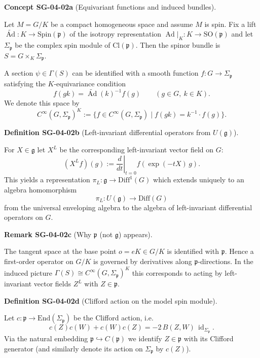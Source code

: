 \documentclass[10pt, letterpaper]{article}
\newcommand{\id}{\operatorname{id}}
\newcommand{\Ad}{\operatorname{Ad}}
\newcommand{\Cinf}{C^{\infty}}
\newcommand{\Diff}{\mathrm{Diff}}
\newcommand{\End}{\mathrm{End}}
\newcommand{\Cl}{\mathrm{Cl}}
\newcommand{\SO}{\mathrm{SO}}
\newcommand{\Spin}{\mathrm{Spin}}
\newcommand{\CustomHeading}[3]{%
  \par\medskip\noindent%
  \textbf{#1 #2} \textnormal{(#3)}.\enskip%
}
\newenvironment{DEF}[2]{\begin{unitbox}\CustomHeading{Definition}{#1}{#2}}{\end{unitbox}}
\newenvironment{REM}[2]{\begin{unitbox}\CustomHeading{Remark}{#1}{#2}}{\end{unitbox}}
\newenvironment{CONC}[2]{\begin{unitbox}\CustomHeading{Concept}{#1}{#2}}{\end{unitbox}}
\begin{document}
\begin{CONC}{SG-04-02a}{Equivariant functions and induced bundles}
Let $M=G/K$ be a compact homogeneous space and assume $M$ is spin. Fix a lift
$\widetilde{\Ad}:K\to \Spin(\mathfrak p)$ of the isotropy representation $\Ad|_K:K\to \SO(\mathfrak p)$
and let $\Sigma_{\mathfrak p}$ be the complex spin module of $\Cl(\mathfrak p)$.
Then the spinor bundle is $S=G\times_K \Sigma_{\mathfrak p}$.

A section $\psi\in\Gamma(S)$ can be identified with a smooth function $f:G\to \Sigma_{\mathfrak p}$
satisfying the $K$-equivariance condition
\[
f(gk)=\widetilde{\Ad}(k)^{-1}f(g)\qquad (g\in G,\ k\in K).
\]
We denote this space by
\[
\Cinf(G,\Sigma_{\mathfrak p})^{K}:=\{f\in \Cinf(G,\Sigma_{\mathfrak p})\mid f(gk)=k^{-1}\cdot f(g)\}.
\]
\end{CONC}

\begin{DEF}{SG-04-02b}{Left-invariant differential operators from $U(\mathfrak g)$}
For $X\in\mathfrak g$ let $X^L$ be the corresponding left-invariant vector field on $G$:
\[
(X^L f)(g):=\left.\frac{d}{dt}\right|_{t=0} f(\exp(-tX)\,g).
\]
This yields a representation $\pi_L:\mathfrak g\to \Diff^1(G)$ which extends uniquely
to an algebra homomorphism
\[
\pi_L:U(\mathfrak g)\longrightarrow \Diff(G)
\]
from the universal enveloping algebra to the algebra of left-invariant differential operators on $G$.
\end{DEF}

\begin{REM}{SG-04-02c}{Why $\mathfrak p$ (not $\mathfrak g$) appears}
The tangent space at the base point $o=eK\in G/K$ is identified with $\mathfrak p$.
Hence a first-order operator on $G/K$ is governed by derivatives along $\mathfrak p$-directions.
In the induced picture $\Gamma(S)\cong \Cinf(G,\Sigma_{\mathfrak p})^K$ this corresponds to acting by
left-invariant vector fields $Z^L$ with $Z\in\mathfrak p$.
\end{REM}

\begin{DEF}{SG-04-02d}{Clifford action on the model spin module}
Let $c:\mathfrak p\to \End(\Sigma_{\mathfrak p})$ be the Clifford action, i.e.
\[
c(Z)c(W)+c(W)c(Z)=-2\,B(Z,W)\,\id_{\Sigma_{\mathfrak p}}.
\]
Via the natural embedding $\mathfrak p\hookrightarrow C(\mathfrak p)$ we identify $Z\in\mathfrak p$
with its Clifford generator (and similarly denote its action on $\Sigma_{\mathfrak p}$ by $c(Z)$).
\end{DEF}
\end{document}

